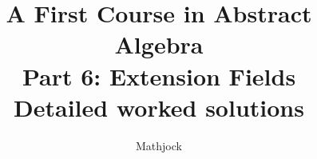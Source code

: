
\title{\textbf{A First Course in Abstract Algebra}\\[0.3em]Part 6: Extension Fields\\[0.3em]\large Detailed worked solutions}
\author{Mathjock}
\date{}

\maketitle
\bookinfo
\tableofcontents
\clearpage
\renewcommand{\thesection}{29}
\renewcommand{\theHsection}{fraleigh.29}

\clearpage
\renewcommand{\thesection}{30}
\renewcommand{\theHsection}{fraleigh.30}

\clearpage
\renewcommand{\thesection}{31}
\renewcommand{\theHsection}{fraleigh.31}

\clearpage
\renewcommand{\thesection}{32}
\renewcommand{\theHsection}{fraleigh.32}

\clearpage
\renewcommand{\thesection}{33}
\renewcommand{\theHsection}{fraleigh.33}


